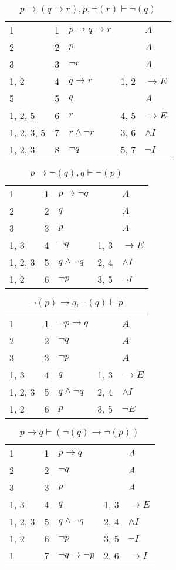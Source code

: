 \documentclass{article}
\begin{document}
\begin{table}[htbp]\caption*{$p→(q→r),p,¬(r) ⊢ ¬(q)$}\centering\begin{tabular}{lrlll}
{1} & 1 & $p→q→r$ & {} & $A$ \\
{2} & 2 & $p$ & {} & $A$ \\
{3} & 3 & $¬r$ & {} & $A$ \\
{1, 2} & 4 & $q→r$ & {1, 2} & $→E$ \\
{5} & 5 & $q$ & {} & $A$ \\
{1, 2, 5} & 6 & $r$ & {4, 5} & $→E$ \\
{1, 2, 3, 5} & 7 & $r∧ ¬r$ & {3, 6} & $∧I$ \\
{1, 2, 3} & 8 & $¬q$ & {5, 7} & $¬I$ \\
\end{tabular}
\end{table}
\begin{table}[htbp]\caption*{$p→ ¬(q),q ⊢ ¬(p)$}\centering\begin{tabular}{lrlll}
{1} & 1 & $p→ ¬q$ & {} & $A$ \\
{2} & 2 & $q$ & {} & $A$ \\
{3} & 3 & $p$ & {} & $A$ \\
{1, 3} & 4 & $¬q$ & {1, 3} & $→E$ \\
{1, 2, 3} & 5 & $q∧ ¬q$ & {2, 4} & $∧I$ \\
{1, 2} & 6 & $¬p$ & {3, 5} & $¬I$ \\
\end{tabular}
\end{table}
\begin{table}[htbp]\caption*{$¬(p)→q,¬(q) ⊢ p$}\centering\begin{tabular}{lrlll}
{1} & 1 & $¬p→q$ & {} & $A$ \\
{2} & 2 & $¬q$ & {} & $A$ \\
{3} & 3 & $¬p$ & {} & $A$ \\
{1, 3} & 4 & $q$ & {1, 3} & $→E$ \\
{1, 2, 3} & 5 & $q∧ ¬q$ & {2, 4} & $∧I$ \\
{1, 2} & 6 & $p$ & {3, 5} & $¬E$ \\
\end{tabular}
\end{table}
\begin{table}[htbp]\caption*{$p→q ⊢ (¬(q)→ ¬(p))$}\centering\begin{tabular}{lrlll}
{1} & 1 & $p→q$ & {} & $A$ \\
{2} & 2 & $¬q$ & {} & $A$ \\
{3} & 3 & $p$ & {} & $A$ \\
{1, 3} & 4 & $q$ & {1, 3} & $→E$ \\
{1, 2, 3} & 5 & $q∧ ¬q$ & {2, 4} & $∧I$ \\
{1, 2} & 6 & $¬p$ & {3, 5} & $¬I$ \\
{1} & 7 & $¬q→ ¬p$ & {2, 6} & $→I$ \\
\end{tabular}
\end{table}
\end{document}
